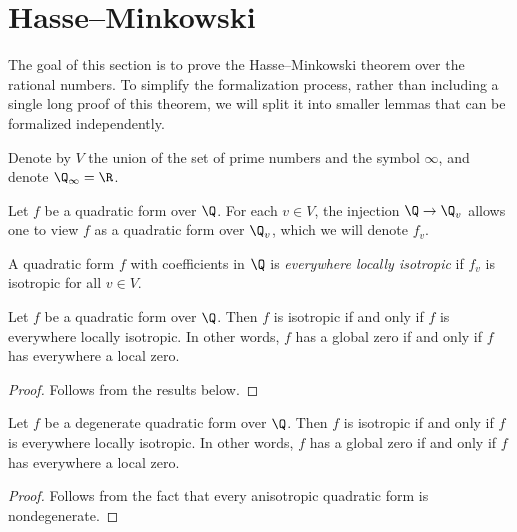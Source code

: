 \section{Hasse--Minkowski}\label{sec:Hasse--Minkowski}

The goal of this section is to prove the Hasse--Minkowski theorem over the rational numbers. To simplify the formalization process, rather than including a single long proof of this theorem, we will split it into smaller lemmas that can be formalized independently.

Denote by $V$ the union of the set of prime numbers and the symbol $\infty$, and denote $\Q_\infty = \R$.

Let $f$ be a quadratic form over $\Q$. For each $v \in V$, the injection $\Q \to \Q_v$ allows one to view $f$ as a quadratic form over $\Q_v$, which we will denote $f_v$.

\begin{definition}\label{def:everywhere_locally_isotropic}
\leanok
A quadratic form $f$ with coefficients in $\Q$ is \emph{everywhere locally isotropic} if $f_v$ is isotropic for all $v \in V$.
\end{definition}

\begin{theorem}\label{thm:Hasse-Minkowski}
\leanok
Let $f$ be a quadratic form over $\Q$. Then $f$ is isotropic if and only if $f$ is everywhere locally isotropic. In other words, $f$ has a global zero if and only if $f$ has everywhere a local zero.
\end{theorem}
\begin{proof}
Follows from the results below.
\end{proof}

\begin{theorem}\label{lem:HM_of_degenerate}
	\leanok
	Let $f$ be a degenerate quadratic form over $\Q$. Then $f$ is isotropic if and only if $f$ is everywhere locally isotropic. In other words, $f$ has a global zero if and only if $f$ has everywhere a local zero.
\end{theorem}
\begin{proof}
\leanok
Follows from the fact that every anisotropic quadratic form is nondegenerate.
\end{proof}

